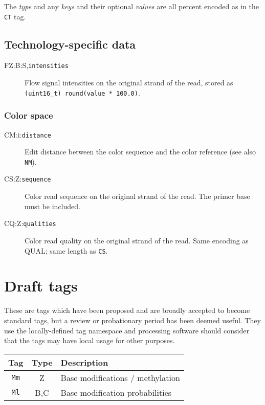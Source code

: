 \documentclass[10pt]{article}
\newcommand{\tagvalue}[1]{{\tt #1}}
\begin{document}
\begin{description}
The \emph{type} and any \emph{keys} and their optional \emph{values}
are all percent encoded as in the {\tt CT} tag.
\end{description}

\subsection{Technology-specific data}

\begin{description}
\item[FZ:B:S,\tagvalue{intensities}]
Flow signal intensities on the original strand of the read, stored as {\tt (uint16\_t) round(value * 100.0)}.
\end{description}

\subsubsection{Color space}


\begin{description}
\item[CM:i:\tagvalue{distance}]
Edit distance between the color sequence and the color reference (see also {\tt NM}).

\item[CS:Z:\tagvalue{sequence}]
Color read sequence on the original strand of the read. The primer base must be included.

\item[CQ:Z:\tagvalue{qualities}]
Color read quality on the original strand of the read. Same encoding as {\sf QUAL}; same length as {\tt CS}.
\end{description}

\section{Draft tags}

These are tags which have been proposed and are broadly accepted to
become standard tags, but a review or probationary period has been
deemed useful.  They use the locally-defined tag namespace and
processing software should consider that the tags may have local usage
for other purposes.

\begin{center}\small
\begin{longtable}{ccp{12.5cm}}
  \hline
  {\bf Tag} & {\bf Type} & {\bf Description} \\
  \hline
  \endhead
  {\tt Mm} & Z & Base modifications / methylation  \\
  {\tt Ml} & B,C & Base modification probabilities \\
\end{longtable}
\end{center}
\end{document}
